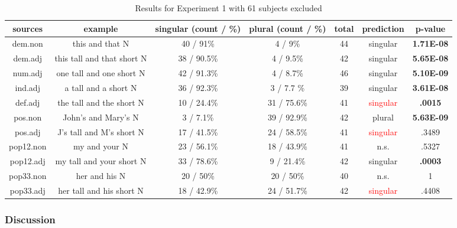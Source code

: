 \documentclass[
  11pt          %
  ,letterpaper  %
  ,center       %
  ,noupper      %
  ]{uconnthesis2}
\begin{document}
\begin{table}[htb!] \small \centering
{
\begin{tabular}{ | c | c | c | c | c | c | c |} \hline 
sources		&	example				& 	singular (count / \%)			&	plural (count / \%)	&	total		& prediction &	p-value \\ \hline
dem.non		&	this and that N			&	\cellcolor{yellow}40 / 91\%		&	4 / 9\%			&	44		& singular &	\textbf{1.71E-08}\\ \hline
dem.adj		&	this tall and that short N	&	\cellcolor{yellow}38 / 90.5\%	&	4 / 9.5\%			&	42		& singular &	\textbf{5.65E-08}\\ \hline
num.adj		&	one tall and one short N	&	\cellcolor{yellow}42 / 91.3\%	&	4 / 8.7\%			&	46		& singular &	\textbf{5.10E-09}\\ \hline
ind.adj		&	a tall and a short N		&	\cellcolor{yellow}36 / 92.3\%	&	3 / 7.7	\%			&	39	& singular &	\textbf{3.61E-08}\\ \hline
def.adj		&	the tall and the short	N	&	10 / 24.4\%			&	\cellcolor{yellow}31 / 75.6\%	& 41	& \textcolor{red}{singular}	&	\textbf{.0015}	\\ \hline
pos.non		&	John's and Mary's N		&	3 / 7.1\%				&	39 / \cellcolor{yellow}92.9\%	&	42	& plural 	&	\textbf{5.63E-09}\\ \hline
pos.adj		&	J's tall and M's short N	&	17 / 41.5\%				&	24 / 58.5\%		&	41	& \textcolor{red}{singular} &	.3489	\\ \hline
pop12.non	&	my and your N			&	23 / 56.1\%				&	18 / 43.9\%		&	41	& n.s.	&	.5327\\ \hline
pop12.adj		&	my tall and your short N	&	33 / \cellcolor{yellow}78.6\%	&	9 / 21.4\%			&	42	& singular &	\textbf{.0003}	\\ \hline
pop33.non	&	her and his N			&	20 / 50\%					&	20 / 50\%			&	40	& n.s.	&	1	\\ \hline
pop33.adj		&	her tall and his short	N	&	18 / 42.9\%				&	24 / 51.7\%		&	42	& \textcolor{red}{singular} &	.4408	\\ \hline
\end{tabular}}
\caption{Results for Experiment 1 with 61 subjects excluded} \label{tab:ch3exp1b}
\end{table} 

\subsubsection{Discussion}
\end{document}
